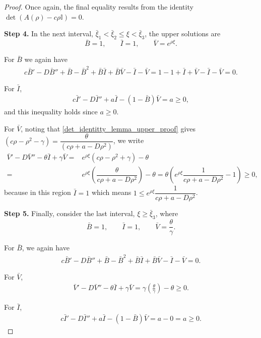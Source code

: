 \documentclass[10pt,a4paper]{amsart}
\begin{document}
\begin{proof}
Once again, the final equality results from the identity $\det(A(\rho)-c\rho \mathbb{I})=0$.

\textbf{Step 4.} In the next interval, $\bar{\xi}_1 < \bar{\xi}_2 \le \xi < \bar{\xi}_3$, the upper solutions are  
\[
\bar{B}=1, \qquad
\bar{I}= 1,
\qquad 
\bar{V}=e^{\rho \xi}.
\]

For $\bar{B}$ we again have
\begin{align}
c\bar{B}'-D\bar{B}''+\bar{B}-\bar{B}^{2}+\bar{B}\bar{I}+\bar{B}\bar{V}-\bar{I}-\bar{V}
= 1 - 1 + \bar{I} + \bar{V} - \bar{I} - \bar{V}
=0.
\end{align}

For $\bar{I}$,
\begin{align}
c\bar{I}' - D\bar{I}'' + a\bar{I} -(1-\bar{B}) \bar{V}
= a
\ge 0,
\end{align}
and this inequality holds since $a\ge0.$

For $\bar{V}$, noting that \eqref{det_identitty_lemma_upper_proof} gives $(c\rho - \rho^{2} - \gamma)=\dfrac{\theta}{(c \rho+a-D\rho^{2})}$, we write
\begin{align}
\bar{V}'-D\bar{V}''- \theta \bar{I} + \gamma \bar{V}
=& e^{\rho \xi}\left(c \rho-\rho^2+\gamma \right) - \theta
\\=& e^{\rho \xi}\left(\dfrac{\theta}{c\rho+a-D\rho^2}\right) - \theta =\theta\left(e^{\rho \xi}\dfrac{1}{c \rho+a-D\rho^2}-1\right)
\ge 0,
\end{align}
because in this region $\bar{I}=1$ which means $1\le e^{\rho \xi} \dfrac{1}{c \rho+a-D\rho^2}$.


\textbf{Step 5.} Finally, consider the last interval, $\xi \ge \bar{\xi}_3$, where  
\[
\bar{B}=1, 
\qquad 
\bar{I}=1,
\qquad 
\bar{V}=\frac{\theta}{\gamma}.
\]

For $\bar{B}$, we again have
\begin{align}
c\bar{B}'-D\bar{B}''+\bar{B}-\bar{B}^{2}+\bar{B}\bar{I}+\bar{B}\bar{V}-\bar{I}-\bar{V}
=0.
\end{align}

For $\bar{V}$,
\begin{align}
\bar{V}'-D\bar{V}''- \theta \bar{I} + \gamma \bar{V}
= \gamma\left(\frac{\theta}{\gamma}\right) - \theta
\ge0.
\end{align}

For $\bar{I}$,
\begin{align}
c\bar{I}'-D\bar{I}'' + a\bar{I} - (1-\bar{B})\bar{V}
= a - 0
= a \ge 0.
\end{align}

\end{proof}
\end{document}
